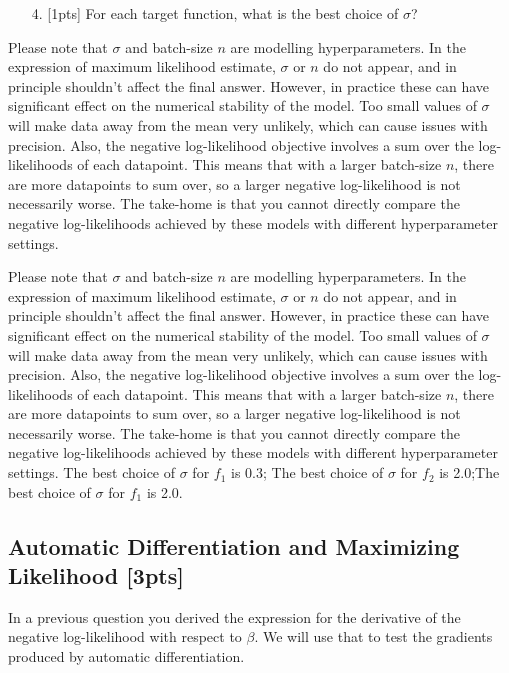 \documentclass[12pt,a4paper]{article}
\begin{document}
\begin{itemize}
\item[4. ] [1pts] For each target function, what is the best choice of $\sigma$?

\end{itemize}
Please note that $\sigma$ and batch-size $n$ are modelling hyperparameters. In the expression of maximum likelihood estimate, $\sigma$ or $n$ do not appear, and in principle shouldn't affect the final answer. However, in practice these can have significant effect on the numerical stability of the model. Too small values of $\sigma$ will make data away from the mean very unlikely, which can cause issues with precision. Also, the negative log-likelihood objective involves a sum over the log-likelihoods of each datapoint. This means that with a larger batch-size $n$, there are more datapoints to sum over, so a larger negative log-likelihood is not necessarily worse. The take-home is that you cannot directly compare the negative log-likelihoods achieved by these models with different hyperparameter settings.

Please note that $\sigma$ and batch-size $n$ are modelling hyperparameters. In the expression of maximum likelihood estimate, $\sigma$ or $n$ do not appear, and in principle shouldn't affect the final answer. However, in practice these can have significant effect on the numerical stability of the model. Too small values of $\sigma$ will make data away from the mean very unlikely, which can cause issues with precision. Also, the negative log-likelihood objective involves a sum over the log-likelihoods of each datapoint. This means that with a larger batch-size $n$, there are more datapoints to sum over, so a larger negative log-likelihood is not necessarily worse. The take-home is that you cannot directly compare the negative log-likelihoods achieved by these models with different hyperparameter settings. The best choice of $\ensuremath{\sigma}$ for $f_1$ is 0.3; The best choice of $\ensuremath{\sigma}$ for $f_2$ is 2.0;The best choice of $\ensuremath{\sigma}$ for $f_1$ is 2.0.

\subsection{Automatic Differentiation and Maximizing Likelihood [3pts]}
In a previous question you derived the expression for the derivative of the negative log-likelihood with respect to $\beta$. We will use that to test the gradients produced by automatic differentiation.
\end{document}
